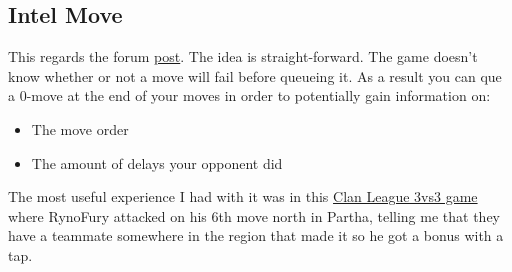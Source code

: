 \subsection{Intel Move}

This regards the forum \href{https://www.warzone.com/Forum/652358-warzone-secret-want-know}{post}. The idea is straight-forward. The game doesn't know whether or not a move will fail before queueing it. As a result you can que a 0-move at the end of your moves in order to potentially gain information on:
\begin{itemize}
    \item The move order
    \item The amount of delays your opponent did
\end{itemize}

The most useful experience I had with it was in this \href{https://www.warzone.com/MultiPlayer?GameID=36761733}{Clan League 3vs3 game} where RynoFury attacked on his 6th move north in Partha, telling me that they have a teammate somewhere in the region that made it so he got a bonus with a tap.
